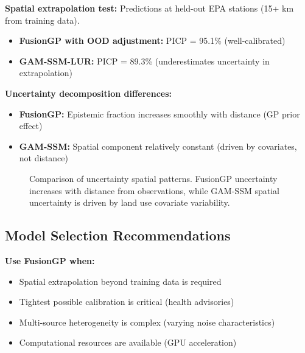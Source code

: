 \documentclass[11pt,letterpaper]{article}
\begin{document}
\textbf{Spatial extrapolation test:} Predictions at held-out EPA stations (15+ km from training data).

\begin{itemize}
    \item \textbf{FusionGP with OOD adjustment:} PICP = 95.1\% (well-calibrated)
    \item \textbf{GAM-SSM-LUR:} PICP = 89.3\% (underestimates uncertainty in extrapolation)
\end{itemize}

\textbf{Uncertainty decomposition differences:}
\begin{itemize}
    \item \textbf{FusionGP:} Epistemic fraction increases smoothly with distance (GP prior effect)
    \item \textbf{GAM-SSM:} Spatial component relatively constant (driven by covariates, not distance)
\end{itemize}

\begin{figure}[h]
\centering
\caption{Comparison of uncertainty spatial patterns. FusionGP uncertainty increases with distance from observations, while GAM-SSM spatial uncertainty is driven by land use covariate variability.}
\label{fig:spatial_patterns}
\end{figure}

\subsection{Model Selection Recommendations}

\textbf{Use FusionGP when:}
\begin{itemize}
    \item Spatial extrapolation beyond training data is required
    \item Tightest possible calibration is critical (health advisories)
    \item Multi-source heterogeneity is complex (varying noise characteristics)
    \item Computational resources are available (GPU acceleration)
\end{itemize}
\end{document}
